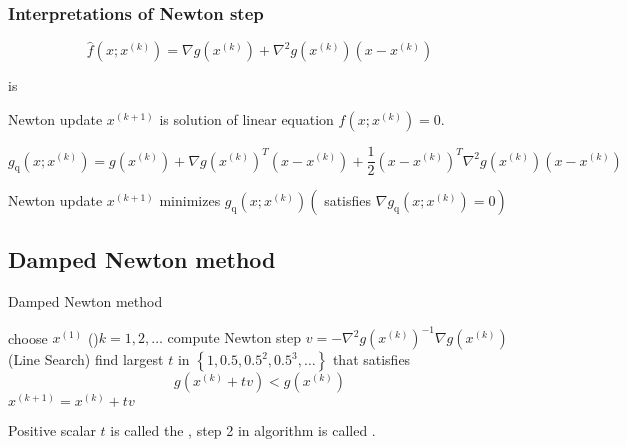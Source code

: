 \subsubsection{Interpretations of Newton step}


\begin{definition}[affine approximation of $ f(x)=\nabla g(x) $ around $ x^{(k)} $]
    \begin{equation}
\hat{f}\left(x ; x^{(k)}\right)=\nabla g\left(x^{(k)}\right)+\nabla^{2} g\left(x^{(k)}\right)\left(x-x^{(k)}\right)
\end{equation}
\end{definition} is

Newton update $ x^{(k+1)} $ is solution of linear equation $ \hat{f}\left(x ; x^{(k)}\right)=0 $.

\begin{definition}
    \begin{equation}
g_{\mathrm{q}}\left(x ; x^{(k)}\right)=g\left(x^{(k)}\right)+\nabla g\left(x^{(k)}\right)^{T}\left(x-x^{(k)}\right)+\frac{1}{2}\left(x-x^{(k)}\right)^{T} \nabla^{2} g\left(x^{(k)}\right)\left(x-x^{(k)}\right)
\end{equation}
\end{definition}

Newton update $ x^{(k+1)} $ minimizes $ g_{\mathrm{q}}\left(x ; x^{(k)}\right)\left(\right. $ satisfies $ \left.\nabla g_{\mathrm{q}}\left(x ; x^{(k)}\right)=0\right) $


\subsection{Damped Newton method}

\begin{algorithm}
    \caption{Damped Newton method}
    choose $ x^{(1)} $\;
    \While(){$ k=1,2, \ldots $}{
        compute Newton step $ v=-\nabla^{2} g\left(x^{(k)}\right)^{-1} \nabla g\left(x^{(k)}\right) $\;
        (Line Search) find largest $ t $ in $ \left\{1,0.5,0.5^{2}, 0.5^{3}, \ldots\right\} $ that satisfies
        \begin{equation}
        g\left(x^{(k)}+t v\right)<g\left(x^{(k)}\right)
        \end{equation}\;
        $ x^{(k+1)}=x^{(k)}+t v $\;
    }
\end{algorithm}

Positive scalar $ t $ is called the , step 2 in algorithm is called .


